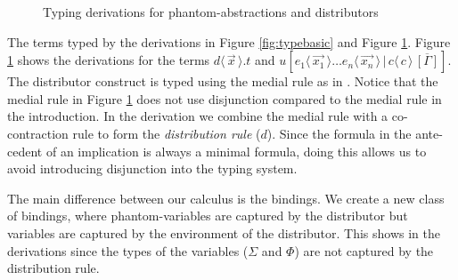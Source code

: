 \documentclass[a4paper,UKenglish,cleveref, autoref]{lipics-v2019}
\newcommand{\fake}[3]{#1 \langle \, #2 \, \rangle . #3}
\newcommand{\dist}[5]{#1 [ #2 \, \vert \, \fakedist{#4}{#5} \, #3 ]}
\newcommand{\fakedist}[2]{#1 \langle \, #2 \, \rangle}
\newcommand{\distrule}{d}
\newcommand{\switchrule}{s}
\begin{document}
\begin{figure}[h]
 \drv{(A \rightarrow \Gamma) \wedge \Delta ; -[\switchrule] ; A^{\color{red}d} \rightarrow \drv[yellow]{\Gamma^{\color{red} \vec{x}} \wedge \Delta ; _[{\color{red}t}] ; C}}
\hspace{1cm}
\drv{\drv[yellow]{\drv[green]{(C \rightarrow C) \wedge \Delta ; -[\switchrule] ; C^{\color{red}c} \rightarrow
	\drv[cyan]{C^{\color{red} c} \wedge \Delta ; _[{\color{red} \overline{[\Gamma]}} ] ; \Sigma \wedge \dots \wedge \Phi} ; -[\distrule] ; (C^{\color{red}e_{1}} \rightarrow \Sigma^{\vec{\color{red}x^{1}}}) \wedge \dots \wedge  (C^{\color{red}e_{n}} \rightarrow \Phi^{\vec{\color{red}x^{n}}})}
	\wedge \Omega} ; _[{\color{red}u}] ; E} 
\caption{Typing derivations for phantom-abstractions and distributors}
\label{fig:derivphandist}
\end{figure}

The terms typed by the derivations in Figure \ref{fig:typebasic} and Figure \ref{fig:derivphandist}. Figure \ref{fig:derivphandist} shows the derivations for the terms $\fake{d}{\vec{x}}{t}$ and $\dist{u}{\fakedist{e_{1}}{\vec{x_{1}}} \dots \fakedist{e_{n}}{\vec{x_{n}}}}{\overline{[\Gamma]}}{c}{c}$. The distributor construct is typed using the medial rule as in \cite{gundersen2013atomic}. Notice that the medial rule in Figure \ref{fig:derivphandist} does not use disjunction compared to the medial rule in the introduction. In the derivation we combine the medial rule with a co-contraction rule to form the \emph{distribution rule} ($d$). Since the formula in the ante-cedent of an implication is always a minimal formula, doing this allows us to avoid introducing disjunction into the typing system. 

The main difference between our calculus is the bindings. We create a new class of bindings, where phantom-variables are captured by the distributor but variables are captured by the environment of the distributor. This shows in the derivations since the types of the variables ($\Sigma$ and $\Phi$) are not captured by the distribution rule. 
\end{document}
